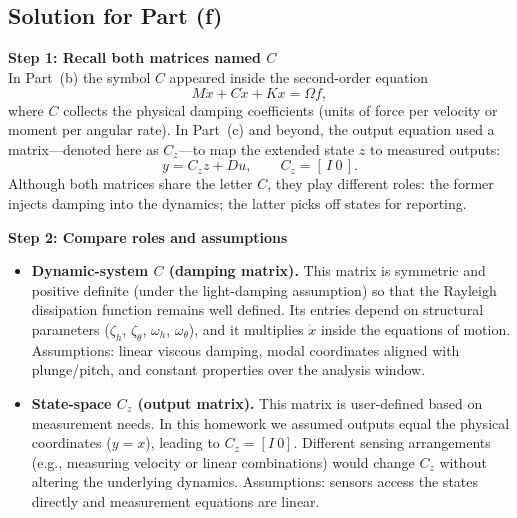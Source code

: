 \documentclass[12pt]{article}
\begin{document}
\clearpage
\subsection*{Solution for Part (f)}

\begin{stepbox}
\textbf{Step 1: Recall both matrices named $C$}\\[0.5em]
In Part~(b) the symbol $C$ appeared inside the second-order equation
\[
M\ddot{x} + C\dot{x} + Kx = \Omega f,
\]
where $C$ collects the physical damping coefficients (units of force per velocity or moment per angular rate).  In Part~(c) and beyond, the output equation used a matrix—denoted here as $C_z$—to map the extended state $z$ to measured outputs:
\[
y = C_z z + D u, \qquad C_z = [\,I \ 0\,].
\]
Although both matrices share the letter $C$, they play different roles: the former injects damping into the dynamics; the latter picks off states for reporting.
\end{stepbox}

\begin{stepbox}
\textbf{Step 2: Compare roles and assumptions}\\[0.5em]
\begin{itemize}
  \item \textbf{Dynamic-system $C$ (damping matrix).} This matrix is symmetric and positive definite (under the light-damping assumption) so that the Rayleigh dissipation function remains well defined.  Its entries depend on structural parameters ($\zeta_h$, $\zeta_\theta$, $\omega_h$, $\omega_\theta$), and it multiplies $\dot{x}$ inside the equations of motion.  Assumptions: linear viscous damping, modal coordinates aligned with plunge/pitch, and constant properties over the analysis window.
  \item \textbf{State-space $C_z$ (output matrix).} This matrix is user-defined based on measurement needs.  In this homework we assumed outputs equal the physical coordinates ($y=x$), leading to $C_z=[I\ 0]$.  Different sensing arrangements (e.g., measuring velocity or linear combinations) would change $C_z$ without altering the underlying dynamics.  Assumptions: sensors access the states directly and measurement equations are linear.
\end{itemize}
\end{stepbox}
\end{document}
